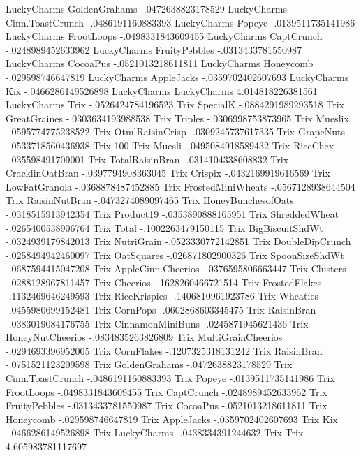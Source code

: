 LuckyCharms	GoldenGrahams	-.0472638823178529
LuckyCharms	Cinn.ToastCrunch	-.0486191160883393
LuckyCharms	Popeye	-.0139511735141986
LuckyCharms	FrootLoops	-.0498331843609455
LuckyCharms	CaptCrunch	-.0248989452633962
LuckyCharms	FruityPebbles	-.0313433781550987
LuckyCharms	CocoaPus	-.0521013218611811
LuckyCharms	Honeycomb	-.029598746647819
LuckyCharms	AppleJacks	-.0359702402607693
LuckyCharms	Kix	-.0466286149526898
LuckyCharms	LuckyCharms	4.014818226381561
LuckyCharms	Trix	-.0526424784196523
Trix	SpecialK	-.0884291989293518
Trix	GreatGraines	-.0303634193988538
Trix	Triples	-.0306998753873965
Trix	Mueslix	-.0595774775238522
Trix	OtmlRaisinCrisp	-.0309245737617335
Trix	GrapeNuts	-.0533718560436938
Trix	100%
Trix	Muesli	-.0495084918589432
Trix	RiceChex	-.035598491709001
Trix	TotalRaisinBran	-.0314104338608832
Trix	CracklinOatBran	-.0397794908363045
Trix	Crispix	-.0432169919616569
Trix	LowFatGranola	-.0368878487452885
Trix	FrostedMiniWheats	-.0567128938644504
Trix	RaisinNutBran	-.0473274089097465
Trix	HoneyBunchesofOats	-.0318515913942354
Trix	Product19	-.0353890888165951
Trix	ShreddedWheat	-.0265400538906764
Trix	Total	-.1002263479150115
Trix	BigBiscuitShdWt	-.0324939179842013
Trix	NutriGrain	-.0523330772142851
Trix	DoubleDipCrunch	-.0258494942460097
Trix	OatSquares	-.026871802900326
Trix	SpoonSizeShdWt	-.0687594415047208
Trix	AppleCinn.Cheerios	-.0376595806663447
Trix	Clusters	-.0288128967811457
Trix	Cheerios	-.1628260466721514
Trix	FrostedFlakes	-.1132469646249593
Trix	RiceKrispies	-.1406810961923786
Trix	Wheaties	-.0455980699152481
Trix	CornPops	-.0602868603345475
Trix	RaisinBran	-.0383019084176755
Trix	CinnamonMiniBuns	-.0245871945621436
Trix	HoneyNutCheerios	-.0834835263826809
Trix	MultiGrainCheerios	-.0294693396952005
Trix	CornFlakes	-.1207325318131242
Trix	RaisinBran	-.0751521123209598
Trix	GoldenGrahams	-.0472638823178529
Trix	Cinn.ToastCrunch	-.0486191160883393
Trix	Popeye	-.0139511735141986
Trix	FrootLoops	-.0498331843609455
Trix	CaptCrunch	-.0248989452633962
Trix	FruityPebbles	-.0313433781550987
Trix	CocoaPus	-.0521013218611811
Trix	Honeycomb	-.029598746647819
Trix	AppleJacks	-.0359702402607693
Trix	Kix	-.0466286149526898
Trix	LuckyCharms	-.0438334391244632
Trix	Trix	4.605983781117697

